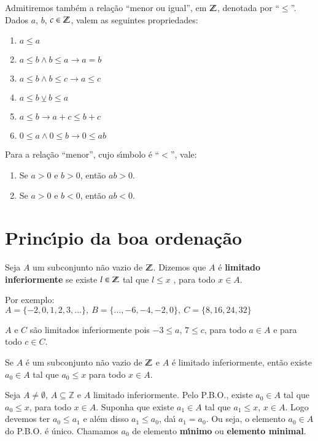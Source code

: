 Admitiremos tamb{\'e}m a rela{\c c}{\~a}o ``menor ou igual'', em $\mathbb{Z}$, denotada por ``$\leq$''. Dados $a$, $b$, $c\in \mathbb{Z}$, valem as seguintes propriedades:
\begin{enumerate}
\item $a\leq a$
\item $a\leq b\wedge b\leq a\rightarrow a=b$
\item $a\leq b\wedge b\leq c\rightarrow a\leq c$
\item $a\leq b\veebar b\leq a$
\item $a\leq b\rightarrow a+c\leq b+c$
\item $0\leq a\wedge 0\leq b\rightarrow 0\leq ab$
\end{enumerate}

Para a rela{\c c}{\~a}o ``menor'', cujo s{\'\i}mbolo {\'e} ``$<$'', vale:
\begin{enumerate}
\item Se $a> 0$ e $b > 0$, então $ab > 0$.
\item Se $a > 0$ e $b<0$, então $ab<0$.
\end{enumerate}

\section{Princ{\'\i}pio da boa ordena{\c c}{\~a}o}

\begin{definicao} 
	Seja $A$ um subconjunto n{\~a}o vazio de $\mathbb{Z}$. Dizemos que $A$ {\'e} \textbf{limitado inferiormente} se existe $l \in \mathbb{Z}$ tal que $l \leq x$
	, para todo $x\in A$.
\end{definicao}

Por exemplo:\\
$A=\{-2,0,1,2,3,...\},\ B=\{...,-6,-4,-2,0\},\ C=\{8,16,24,32\}$

$A$ e $C$ s{\~a}o limitados inferiormente pois $-3\leq a$, $7\leq c$, para todo $a\in A$ e para todo $c\in C$.

\begin{definicao}
	Se $A$ {\'e} um subconjunto n{\~a}o vazio de $\mathbb{Z}$ e $A$ {\'e} limitado inferiormente, ent{\~a}o existe $a_{0}\in A$ tal que $a_{0}\leq x$ para todo $x\in A$.
\end{definicao}

Seja $A\neq\emptyset$, $A\subseteq\mathbb{Z}$ e $A$ limitado inferiormente. Pelo P.B.O., existe $a_{0}\in A$ tal que $a_{0}\leq x$, para todo $x\in A$. Suponha que existe $a_{1}\in A$ tal que $a_{1}\leq x$, $x\in A$. Logo devemos ter $a_{0}\leq a_{1}$ e al\'em disso $a_{1}\leq a_{0}$, da{\'\i} $a_{1}=a_{0}$. Ou seja, o elemento $a_{0}\in A$ do P.B.O. {\'e} {\'u}nico. Chamamos $a_{0}$ de elemento \textbf{m{\'\i}nimo} ou \textbf{elemento minimal}.

